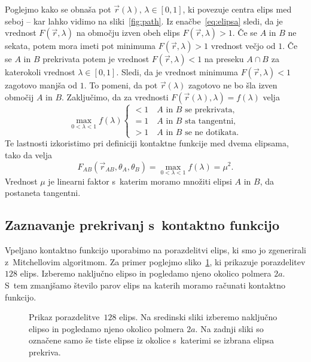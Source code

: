 \noindent Poglejmo kako se obnaša pot $\vec{r}(\lambda), \, \lambda \in [0,1]$, ki povezuje 
centra elips med seboj -- kar lahko vidimo na sliki~\ref{fig:path}.
Iz enačbe~\ref{eq:elipsa} sledi, da je vrednost $F(\vec{r}, \lambda)$ na območju 
izven obeh elips $F(\vec{r}, \lambda)>1$. Če se $A$ in $B$ ne sekata, potem mora imeti 
pot minimuma $F(\vec{r}, \lambda)>1$ vrednost večjo od $1$. Če se $A$ in $B$ prekrivata 
potem je vrednost $F(\vec{r}, \lambda)<1$ na preseku $A \cap B$ za katerokoli vrednost 
$\lambda \in [0,1]$.  Sledi, da je vrednost minimuma $F(\vec{r}, \lambda)<1$ zagotovo 
manjša od $1$. To pomeni, da pot $\vec{r}(\lambda)$ zagotovo ne bo šla izven območij
$A$ in $B$. Zaključimo, da za vrednosti $F(\vec{r}(\lambda), \lambda) = 
f(\lambda)$ velja
\begin{equation}
    \max_{0<\lambda<1} f(\lambda)
    \begin{cases}
        <1 \quad\text{$A$ in $B$ se prekrivata,}\\
        =1 \quad\text{$A$ in $B$ sta tangentni,}\\
        >1 \quad\text{$A$ in $B$ se ne dotikata.}
    \end{cases}
    \label{eq:kriterij}
\end{equation}
Te lastnosti izkoristimo pri definiciji kontaktne funkcije med dvema elipsama, tako da
velja
\begin{equation}
    F_{A B}(\vec{r}_{A B}, \theta_A, \theta_B) =
    \max_{0<\lambda<1} f(\lambda) = \mu^2.
    \label{eq:kontakt}
\end{equation}
Vrednost $\mu$ je linearni faktor s~katerim moramo množiti elipsi $A$ in $B$, da 
postaneta tangentni.
\subsection{Zaznavanje prekrivanj s~kontaktno funkcijo}
Vpeljano kontaktno funkcijo uporabimo na porazdelitvi elips, ki smo jo zgenerirali
z~Mitchellovim algoritmom. 
Za primer poglejmo sliko~\ref{fig:zaznavanje_trkov}, ki prikazuje porazdelitev
$128$ elips. Izberemo naključno elipso in pogledamo njeno okolico polmera $2a$.
S~tem zmanjšamo število parov elips na katerih moramo računati kontaktno funkcijo.
\begin{figure}[!ht]
    \centering
    \resizebox{.32\textwidth}{!}{}
    \resizebox{.32\textwidth}{!}{}
    \resizebox{.32\textwidth}{!}{}
    \caption{Prikaz porazdelitve~$128$ elips.
    Na sredinski sliki izberemo naključno elipso in pogledamo njeno okolico polmera 
    $2a$. Na zadnji sliki so označene samo še tiste elipse iz okolice s~katerimi 
    se izbrana elipsa prekriva.}
    \label{fig:zaznavanje_trkov}
\end{figure}

